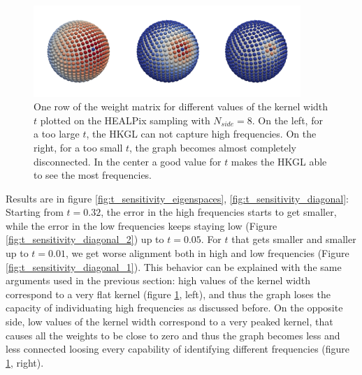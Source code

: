\begin{figure}[h!]
	\centering
	\includegraphics[width=0.9\textwidth]{figs/chapter1/t.png}	
	\caption{\label{fig:weights}One row of the weight matrix for different values of the kernel width $t$ plotted on the HEALPix sampling with $N_{side}=8$. On the left, for a too large $t$, the HKGL can not capture high frequencies. On the right, for a too small $t$, the graph becomes almost completely disconnected. In the center a good value for $t$ makes the HKGL able to see the most frequencies.}
\end{figure}

Results are in figure \ref{fig:t_sensitivity_eigenspaces}, \ref{fig:t_sensitivity_diagonal}: Starting from $t=0.32$, the error in the high frequencies starts to get smaller, while the error in the low frequencies keeps staying low (Figure \ref{fig:t_sensitivity_diagonal_2}) up to $t=0.05$. For $t$ that gets smaller and smaller up to $t=0.01$, we get worse alignment both in high and low frequencies (Figure \ref{fig:t_sensitivity_diagonal_1}). This behavior can be explained with the same arguments used in the previous section: high values of the kernel width correspond to a very flat kernel (figure \ref{fig:weights}, left), and thus the graph loses the capacity of individuating high frequencies as discussed before. On the opposite side, low values of the kernel width correspond to a very peaked kernel, that causes all the weights to be close to zero and thus the graph becomes less and less connected loosing every capability of identifying different frequencies  (figure \ref{fig:weights}, right). 

